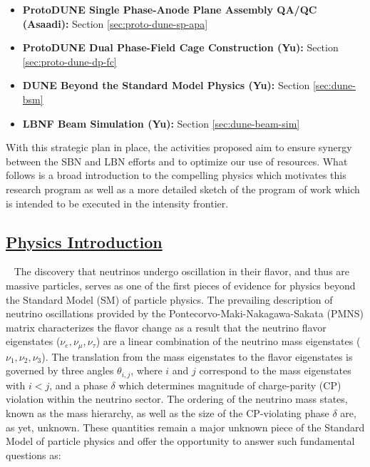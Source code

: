 \begin{itemize}[noitemsep,nolistsep]

\item{\textbf{ProtoDUNE Single Phase-Anode Plane Assembly QA/QC (Asaadi):}} Section \ref{sec:proto-dune-sp-apa}

\item {{\bf ProtoDUNE Dual Phase-Field Cage Construction (Yu):}} Section \ref{sec:proto-dune-dp-fc}

\item {\textbf{DUNE Beyond the Standard Model Physics (Yu):}} Section \ref{sec:dune-bsm}

\item {\textbf{LBNF Beam Simulation (Yu):}} Section \ref{sec:dune-beam-sim}

\end{itemize}


With this strategic plan in place, the activities proposed aim to ensure synergy between the SBN and LBN efforts and to optimize our use of resources. What follows is a broad introduction to the compelling physics which motivates this research program as well as a more detailed sketch of the program of work which is intended to be executed in the intensity frontier.
\subsection*{\underline{Physics Introduction}}~\label{ss:if-physics}
The discovery that neutrinos undergo oscillation in their flavor, and thus are massive particles, serves as one of the first pieces of evidence for physics beyond the Standard Model (SM) of particle physics. The prevailing description of neutrino oscillations provided by the Pontecorvo-Maki-Nakagawa-Sakata (PMNS) matrix characterizes the flavor change as a result that the neutrino flavor eigenstates ($\nu_{e}, \nu_{\mu}, \nu_{\tau}$) are a linear combination of the neutrino mass eigenstates ($\nu_{1}, \nu_{2}, \nu_{3}$). The translation from the mass eigenstates to the flavor eigenstates is governed by three angles $\theta_{i,j}$, where $i$ and $j$ correspond to the mass eigenstates with $i < j$, and a phase $\delta$ which determines magnitude of charge-parity (CP) violation within the neutrino sector.  The ordering of the neutrino mass states, known as the mass hierarchy, as well as the size of the CP-violating phase $\delta$ are, as yet, unknown. These quantities remain a major unknown piece of the Standard Model of particle physics and offer the opportunity to answer such fundamental questions as:

